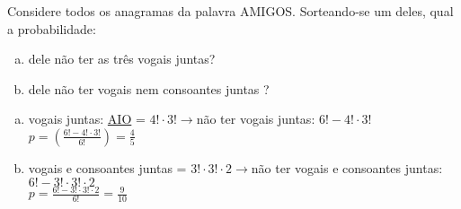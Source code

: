 \begin{ex}
 Considere todos os anagramas da palavra AMIGOS. Sorteando-se um deles, qual a probabilidade:
    \begin{enumerate}[(a)]
    \item dele não ter as três vogais juntas?
    \item dele não ter vogais nem consoantes juntas ?
    \end{enumerate}
      \begin{sol}
          \phantom{A} 
        \begin{enumerate}  [(a)]
            \item
            vogais juntas: \underline{AIO} \underline{\phantom{A}} \underline{\phantom{A}} \underline{\phantom{A}} = $4!\cdot3!\longrightarrow$não ter vogais juntas: $6!-4!\cdot3!$\\
            $p=(\frac{6!-4!\cdot3!}{6!})=\frac{4}{5}$
            \item vogais e consoantes juntas = $3!\cdot3!\cdot2\longrightarrow$não ter vogais e consoantes juntas: $6!-3!\cdot3!\cdot2$\\
            $p=\frac{6!-3!\cdot3!\cdot2}{6!}=\frac{9}{10}$
        \end{enumerate}
      \end{sol}
\end{ex}